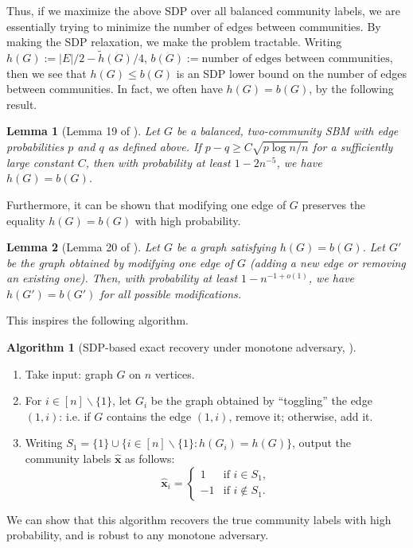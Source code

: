 \documentclass[11pt, titlepage]{article} %
\numberwithin{equation}{section}
\newtheorem{lemma}{Lemma}
\theoremstyle{definition}
\newtheorem{algorithm}{Algorithm}
\numberwithin{theorem}{section}
\numberwithin{lemma}{section}
\numberwithin{corollary}{section}
\numberwithin{proposition}{section}
\numberwithin{definition}{section}
\numberwithin{remark}{section}
\begin{document}
Thus, if we maximize the above SDP over all balanced community labels, we are essentially trying to
minimize the number of edges between communities. By making the SDP relaxation, we make the problem
tractable. Writing $h(G) := |E|/2 - \tilde{h}(G)/4$, $b(G) := \text{number of edges between communities}$,
then we see that $h(G) \leq b(G)$ is an SDP lower bound on the number of edges between communities. 
In fact, we often have $h(G) = b(G)$, by the following result.
\begin{lemma}[Lemma 19 of \cite{FK01}]
\label{lem:SBM.hb}
Let $G$ be a balanced, two-community SBM with edge probabilities $p$ and $q$ as defined above. 
If $p - q \geq C \sqrt{p \log n / n}$ for a sufficiently large constant $C$, then with
probability at least $1 - 2 n^{-5}$, we have $h(G) = b(G)$.
\end{lemma}
Furthermore, it can be shown that modifying one edge of $G$ preserves the equality $h(G) = b(G)$ 
with high probability.
\begin{lemma}[Lemma 20 of \cite{FK01}]
\label{lem:modSBM.hb}
Let $G$ be a graph satisfying $h(G) = b(G)$. Let $G'$ be the graph obtained by modifying one edge of
$G$ (adding a new edge or removing an existing one). Then, with probability at least
$1 - n^{-1 + o(1)}$, we have $h(G') = b(G')$ for all possible modifications.
\end{lemma}
This inspires the following algorithm.
\begin{algorithm}[SDP-based exact recovery under monotone adversary, \cite{FK01}]
\label{alg:monotone.SDP}
\leavevmode
\begin{enumerate}
  \item[0.] Take input: graph $G$ on $n$ vertices.
  \item[1.] For $i \in [n]\backslash \{1\}$, let $G_i$ be the graph obtained by ``toggling'' the edge 
  $(1,i)$: i.e. if $G$ contains the edge $(1,i)$, remove it; otherwise, add it.
  \item[2.] Writing $S_1 = \{1\} \cup \{i \in [n]\backslash \{1\}: h(G_i) = h(G)\}$,
  output the community labels $\hat{\bm{x}}$ as follows:
  \[
  \hat{\bm{x}}_i = \begin{cases}
1 & \text{if } i \in S_1,\\
-1 & \text{if } i \notin S_1.
\end{cases}
  \]
\end{enumerate}
\end{algorithm}
We can show that this algorithm recovers the true community labels with high probability, 
and is robust to any monotone adversary.
\end{document}
